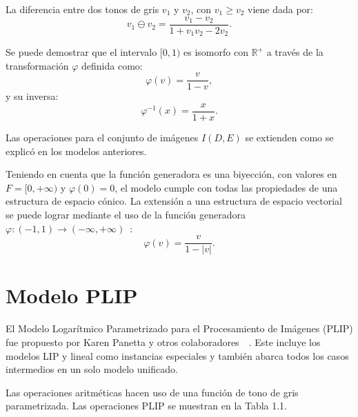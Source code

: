 La diferencia entre dos tonos de gris $v_1$ y $v_2$, con $v_1 \geq v_2$ viene dada por:
\begin{equation}
	v_1\ominus v_2=\frac{v_1-v_2}{1+v_1v_2-2v_2}.
\end{equation}

Se puede demostrar que el intervalo $[0, 1)$ es isomorfo con $\mathbb{R}^+$ a través de la transformaci\'on $\varphi$ definida como:
\begin{equation}
	\varphi(v)=\frac{v}{1-v},
\end{equation}
y su inversa:
\begin{equation}
	\varphi^{-1}(x)=\frac{x}{1+x}.
\end{equation}

Las operaciones para el conjunto de im\'agenes $I(D,E)$ se extienden como se explic\'o en los modelos anteriores.

Teniendo en cuenta que la función generadora es una biyección, con valores en $F = [ 0 , +\infty )$ y $\varphi(0)=0$, el modelo cumple con todas las propiedades de una estructura de espacio cónico. La extensión a una estructura de espacio vectorial se puede lograr mediante el uso de la función generadora $\varphi:(-1,1)\to (-\infty,+\infty)$~\cite{florea2009piecewise}:
\begin{equation}
	\varphi(v)=\frac{v}{1-|v|}.
\end{equation}

\section{Modelo PLIP}

El Modelo Logar\'itmico Parametrizado para el Procesamiento de Im\'agenes (PLIP) fue propuesto por Karen Panetta y otros colaboradores~\cite{panetta2007parameterization}~\cite{panetta2010parameterized}. Este incluye los modelos LIP y lineal como instancias especiales y también abarca todos los casos intermedios en un solo modelo unificado.

Las operaciones aritméticas hacen uso de una función de tono de gris parametrizada. Las operaciones PLIP se muestran en la Tabla 1.1.

